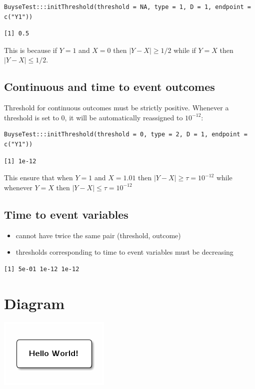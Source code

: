 \documentclass{article}
\begin{document}
\lstset{language=r,label= ,caption= ,captionpos=b,numbers=none}
\begin{lstlisting}
BuyseTest:::initThreshold(threshold = NA, type = 1, D = 1, endpoint = c("Y1"))
\end{lstlisting}

\begin{verbatim}
[1] 0.5
\end{verbatim}

This is because if \(Y=1\) and \(X=0\) then \(|Y-X| \geq 1/2\) 
while if \(Y=X\) then \(|Y-X| \leq 1/2\).

\subsection{Continuous and time to event outcomes}
\label{sec:orgb092f02}

Threshold for continuous outcomes must be strictly positive. Whenever
a threshold is set to 0, it will be automatically reassigned to \(10^{-12}\):
\lstset{language=r,label= ,caption= ,captionpos=b,numbers=none}
\begin{lstlisting}
BuyseTest:::initThreshold(threshold = 0, type = 2, D = 1, endpoint = c("Y1"))
\end{lstlisting}

\begin{verbatim}
[1] 1e-12
\end{verbatim}

This ensure that when \(Y=1\) and \(X=1.01\) then
\(|Y-X| \geq \tau=10^{-12}\) while whenever \(Y=X\) then \(|Y-X| \leq \tau=10^{-12}\)

\subsection{Time to event variables}
\label{sec:org0b0ea0a}


\begin{itemize}
\item cannot have twice the same pair (threshold, outcome)
\item thresholds corresponding to time to event variables must be decreasing
\end{itemize}


\begin{verbatim}
[1] 5e-01 1e-12 1e-12
\end{verbatim}

\section{Diagram}
\label{sec:org3e402f6}

\begin{center}
\includegraphics[width=.9\linewidth]{hello-world-round.png}
\end{center}
\end{document}
